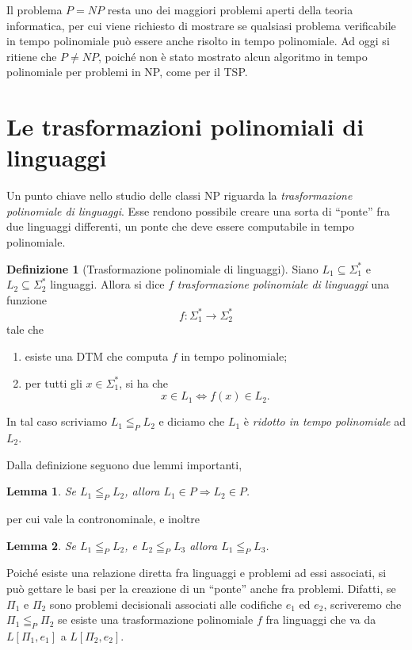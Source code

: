 \documentclass[10pt]{\classname}
\theoremstyle{newlinethm}
\theoremstyle{theorem}
\newtheorem{lemma}{Lemma}[section]
\theoremstyle{definition}
\newtheorem{definizione}{Definizione}[section]
\theoremstyle{definition}
\theoremstyle{definition}
\theoremstyle{definition}
\begin{document}
Il problema $P = NP$ resta uno dei maggiori problemi aperti della teoria informatica, per cui viene richiesto di mostrare se qualsiasi problema verificabile in tempo polinomiale può essere anche risolto in tempo polinomiale. Ad oggi si ritiene che $P \neq NP$, poiché non è stato mostrato alcun algoritmo in tempo polinomiale per problemi in NP, come per il TSP.

\section{Le trasformazioni polinomiali di linguaggi}

Un punto chiave nello studio delle classi NP riguarda la \emph{trasformazione polinomiale di linguaggi}. Esse rendono possibile creare una sorta di ``ponte'' fra due linguaggi differenti, un ponte che deve essere computabile in tempo polinomiale.

\begin{definizione}[Trasformazione polinomiale di linguaggi]
    Siano $L_1 \subseteq \Sigma_1^*$ e $L_2 \subseteq \Sigma_2^*$ linguaggi. Allora si dice $f$ \emph{trasformazione polinomiale di linguaggi} una funzione \[f:\Sigma_1^* \rightarrow \Sigma_2^*\] tale che 
\begin{enumerate}
    \item esiste una DTM che computa $f$ in tempo polinomiale;
    \item per tutti gli $x \in \Sigma_1^*$, si ha che \[x \in L_1 \Leftrightarrow f(x) \in L_2.\]
\end{enumerate}
In tal caso scriviamo $L_1 \leqq_P L_2$ e diciamo che $L_1$ è \emph{ridotto in tempo polinomiale} ad $L_2$.
\end{definizione}
Dalla definizione seguono due lemmi importanti,
\begin{lemma}
    Se $L_1 \leqq_P L_2$, allora $L_1 \in P \Rightarrow L_2 \in P$.
\end{lemma}
per cui vale la contronominale, e inoltre
\begin{lemma}
    Se $L_1 \leqq_P L_2$, e $L_2 \leqq_P L_3$ allora $L_1 \leqq_P L_3$.
\end{lemma}

Poiché esiste una relazione diretta fra linguaggi e problemi ad essi associati, si può gettare le basi per la creazione di un ``ponte'' anche fra problemi.
Difatti, se $\Pi_1$ e $\Pi_2$ sono problemi decisionali associati alle codifiche $e_1$ ed $e_2$, scriveremo che $\Pi_1 \leqq_P \Pi_2$ se esiste una trasformazione polinomiale $f$ fra linguaggi che va da $L[\Pi_1, e_1]$ a $L[\Pi_2, e_2]$.
\end{document}
